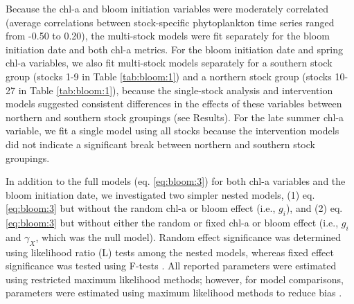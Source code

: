 Because the chl-a and bloom initiation variables were moderately correlated
(average correlations between stock-specific phytoplankton time series ranged
from -0.50 to 0.20), the multi-stock models were fit separately for the bloom
initiation date and both chl-a metrics. For the bloom initiation date and spring
chl-a variables, we also fit multi-stock models separately for a southern stock
group (stocks 1-9 in Table \ref{tab:bloom:1}) and a northern stock group (stocks 10-27 in Table
\ref{tab:bloom:1}), because the single-stock analysis and intervention models suggested
consistent differences in the effects of these variables between northern and
southern stock groupings (see Results). For the late summer chl-a variable, we
fit a single model using all stocks because the intervention models did not
indicate a significant break between northern and southern stock groupings.

In addition to the full models (eq. \ref{eq:bloom:3}) for both chl-a variables and the bloom
initiation date, we investigated two simpler nested models, (1) eq. \ref{eq:bloom:3} but
without the random chl-a or bloom effect (i.e., \(g_{i}\)), and (2) eq. \ref{eq:bloom:3} but
without either the random or fixed chl-a or bloom effect (i.e., \(g_{i}\) and
\(\gamma_{X}\), which was the null model).  Random effect significance was
determined using likelihood ratio (L) tests among the nested models, whereas
fixed effect significance was tested using F-tests \citep{Pinheiro2000a}. All
reported parameters were estimated using restricted maximum likelihood methods;
however, for model comparisons, parameters were estimated using maximum
likelihood methods to reduce bias \citep{Pinheiro2000a}.

